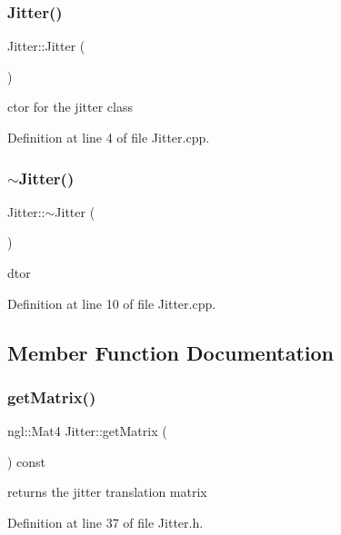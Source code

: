 \subsubsection{Jitter()}
{\footnotesize\ttfamily Jitter\+::\+Jitter (\begin{DoxyParamCaption}{ }\end{DoxyParamCaption})}



ctor for the jitter class 



Definition at line 4 of file Jitter.\+cpp.

\mbox{\label{class_jitter_ab758097d6315fafe62add573bfd2f338}} 
\subsubsection{$\sim$Jitter()}
{\footnotesize\ttfamily Jitter\+::$\sim$\+Jitter (\begin{DoxyParamCaption}{ }\end{DoxyParamCaption})}



dtor 



Definition at line 10 of file Jitter.\+cpp.



\subsection{Member Function Documentation}
\mbox{\label{class_jitter_a6846cef13fabacb867504489b716f9b8}} 
\subsubsection{getMatrix()}
{\footnotesize\ttfamily ngl\+::\+Mat4 Jitter\+::get\+Matrix (\begin{DoxyParamCaption}{ }\end{DoxyParamCaption}) const\hspace{0.3cm}{\ttfamily [inline]}}



returns the jitter translation matrix 



Definition at line 37 of file Jitter.\+h.

\mbox{\label{class_jitter_a1bbe27eaa582da19f6cc7b1a1a78cbc1}} 

